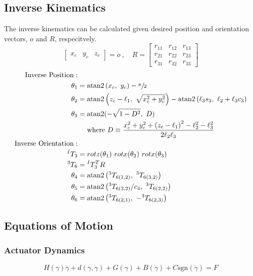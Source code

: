 \subsection{Inverse Kinematics}
The inverse kinematics can be calculated given desired position and orientation vectors, $o$ and $R$, respecitvely.
\[
\begin{bmatrix}x_c & y_c & z_c \end{bmatrix} = o~,\quad
  R =
  \begin{bmatrix}
    r_{11} & r_{12} & r_{13} \\
    r_{21} & r_{22} & r_{23} \\
    r_{31} & r_{32} & r_{33}
  \end{bmatrix}
\]
\begin{equation}
\begin{aligned}
\quad\text{Inverse Position}: \\
\theta_{1}&= \text{atan2} \left(x_{c},~ y_{c}\right) - \sfrac{\pi}{2}\\
\theta_{2}&= \text{atan2} \left(z_c - \ell_1, ~\sqrt{x_c^2 + y_c^2}\right) - \text{atan2}\left(\ell_3s_3,~\ell_2 + \ell_3c_3\right) \\
\theta_{3}&= \text{atan2} (-\sqrt{1-D^{2}},~ D) \\
& \quad \text { where } D\equiv\frac{x_{c}^{2}+y_{c}^{2}+\left(z_{c}-\ell_{1}\right)^{2}-\ell_{2}^{2}-\ell_{3}^{2}}{2 \ell_{2} \ell_{3}} \\
\quad\text{Inverse Orientation}:\\
^IT_3 &= rotz(\theta_1)~rotx(\theta_2)~rotx(\theta_3) \\
{}^3T_6 &= {}^IT_3^TR \\ %
\theta_4 &= \text{atan2} \left({}^3T_{6(1,2)},~{}^3T_{6(3,2)}\right) \\
\theta_5 &= \text{atan2} \left({{}^3T_{6(3,2)}} / {c_4},~{}^3T_{6(2,2)}\right) \\
\theta_6 &= \text{atan2} \left({}^3T_{6(2,1)},~ -{}^3T_{6(2,3)}\right) \\
\end{aligned}
\nonumber
\end{equation}
\newpage

\subsection{Equations of Motion}
\subsubsection{Actuator Dynamics}

\begin{equation}
  H(\gamma)\ddot{\gamma}+d(\gamma,\dot{\gamma})+G(\gamma)+B(\dot{\gamma})+C\text{sgn}(\dot{\gamma}) = F
  \label{eq:dynamics}
\end{equation}

